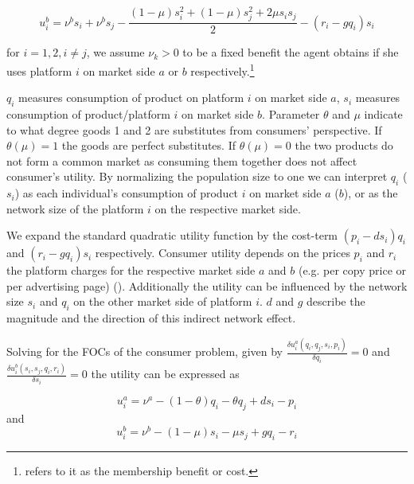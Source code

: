 \documentclass[10pt,a4paper]{scrreprt}
\begin{document}
\begin{equation}\label{4.2}
u_i^b = \nu^b s_i + \nu^b s_j -\frac{(1-\mu) s^2_i+ (1-\mu) s^2_j+2 \mu s_i s_j}{2}-(r_i-g q_i)s_i
\end{equation}

for $i=1,2, i \neq j$, we assume $\nu_k > 0$ to be a fixed benefit the agent obtains if she uses platform $i$ on market side $a$ or $b$ respectively.\footnote{\cite{weyl_price_2010} refers to it as the membership benefit or cost.}

$q_i$ measures consumption of product on platform $i$ on market side $a$, $s_i$ measures consumption of product/platform $i$ on market side $b$. Parameter $\theta$ and $\mu$ indicate to what degree goods 1 and 2 are substitutes from consumers' perspective. If $\theta (\mu) = 1$ the goods are perfect substitutes. If $\theta (\mu) = 0$ the two products do not form a common market as consuming them together does not affect consumer's utility. By normalizing the population size to one we can interpret $q_i$ ($s_i$) as each individual’s consumption of product $i$ on market side $a$ ($b$), or as the network size of the platform $i$ on the respective market side.

We expand the standard quadratic utility function by the cost-term $(p_i-d s_i)q_i$ and $(r_i-g q_i)s_i$ respectively. Consumer utility depends on the prices $p_i$ and $r_i$ the platform charges for the respective market side  $a$ and $b$ (e.g. per copy price or per advertising page) (\cite{kind_business_2009}). Additionally the utility can be influenced by the network size $s_i$ and $q_i$ on the other market side of platform $i$. $d$ and $g$ describe the magnitude and the direction of this indirect network effect. 

Solving for the FOCs of the consumer problem, given by $\frac{\delta u_i^a(q_i,q_j,s_i,p_i)}{\delta q_i}=0$ and  $\frac{\delta u_i^b(s_i,s_j,q_i,r_i)}{\delta s_i}=0$ the utility can be expressed as

\begin{equation}\label{utility_a}
u_i^a = \nu^a-(1-\theta) q_i - \theta q_j +ds_i - p_i
\end{equation}
and
\begin{equation}\label{utility_b}
u_i^b=\nu^b-(1-\mu) s_i - \mu s_j +gq_i - r_i
\end{equation} 
\end{document}
